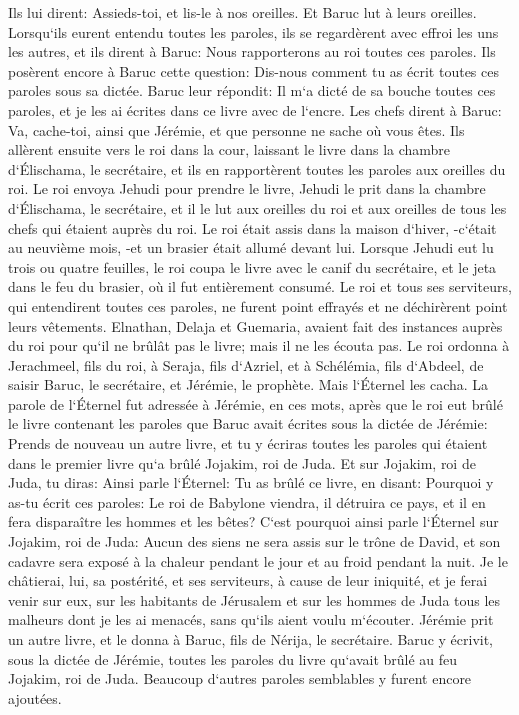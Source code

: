 \verse Ils lui dirent: Assieds-toi, et lis-le à nos oreilles. Et Baruc lut à leurs oreilles. 
\verse Lorsqu`ils eurent entendu toutes les paroles, ils se regardèrent avec effroi les uns les autres, et ils dirent à Baruc: Nous rapporterons au roi toutes ces paroles. 
\verse Ils posèrent encore à Baruc cette question: Dis-nous comment tu as écrit toutes ces paroles sous sa dictée. 
\verse Baruc leur répondit: Il m`a dicté de sa bouche toutes ces paroles, et je les ai écrites dans ce livre avec de l`encre. 
\verse Les chefs dirent à Baruc: Va, cache-toi, ainsi que Jérémie, et que personne ne sache où vous êtes. 
\verse Ils allèrent ensuite vers le roi dans la cour, laissant le livre dans la chambre d`Élischama, le secrétaire, et ils en rapportèrent toutes les paroles aux oreilles du roi. 
\verse Le roi envoya Jehudi pour prendre le livre, Jehudi le prit dans la chambre d`Élischama, le secrétaire, et il le lut aux oreilles du roi et aux oreilles de tous les chefs qui étaient auprès du roi. 
\verse Le roi était assis dans la maison d`hiver, -c`était au neuvième mois, -et un brasier était allumé devant lui. 
\verse Lorsque Jehudi eut lu trois ou quatre feuilles, le roi coupa le livre avec le canif du secrétaire, et le jeta dans le feu du brasier, où il fut entièrement consumé. 
\verse Le roi et tous ses serviteurs, qui entendirent toutes ces paroles, ne furent point effrayés et ne déchirèrent point leurs vêtements. 
\verse Elnathan, Delaja et Guemaria, avaient fait des instances auprès du roi pour qu`il ne brûlât pas le livre; mais il ne les écouta pas. 
\verse Le roi ordonna à Jerachmeel, fils du roi, à Seraja, fils d`Azriel, et à Schélémia, fils d`Abdeel, de saisir Baruc, le secrétaire, et Jérémie, le prophète. Mais l`Éternel les cacha. 
\verse La parole de l`Éternel fut adressée à Jérémie, en ces mots, après que le roi eut brûlé le livre contenant les paroles que Baruc avait écrites sous la dictée de Jérémie: 
\verse Prends de nouveau un autre livre, et tu y écriras toutes les paroles qui étaient dans le premier livre qu`a brûlé Jojakim, roi de Juda. 
\verse Et sur Jojakim, roi de Juda, tu diras: Ainsi parle l`Éternel: Tu as brûlé ce livre, en disant: Pourquoi y as-tu écrit ces paroles: Le roi de Babylone viendra, il détruira ce pays, et il en fera disparaître les hommes et les bêtes? 
\verse C`est pourquoi ainsi parle l`Éternel sur Jojakim, roi de Juda: Aucun des siens ne sera assis sur le trône de David, et son cadavre sera exposé à la chaleur pendant le jour et au froid pendant la nuit. 
\verse Je le châtierai, lui, sa postérité, et ses serviteurs, à cause de leur iniquité, et je ferai venir sur eux, sur les habitants de Jérusalem et sur les hommes de Juda tous les malheurs dont je les ai menacés, sans qu`ils aient voulu m`écouter. 
\verse Jérémie prit un autre livre, et le donna à Baruc, fils de Nérija, le secrétaire. Baruc y écrivit, sous la dictée de Jérémie, toutes les paroles du livre qu`avait brûlé au feu Jojakim, roi de Juda. Beaucoup d`autres paroles semblables y furent encore ajoutées. 

